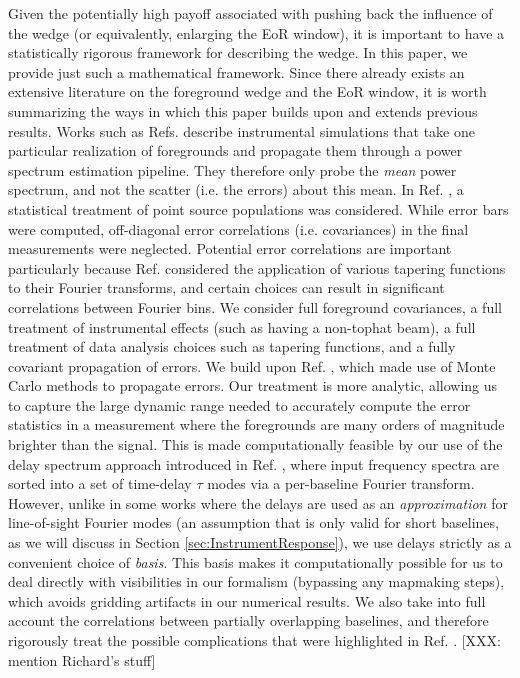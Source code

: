 \documentclass[twocolumn,aps,prd,nofootinbib,showpacs]{revtex4-1}
\begin{document}
Given the potentially high payoff associated with pushing back the influence of the wedge (or equivalently, enlarging the EoR window), it is important to have a statistically rigorous framework for describing the wedge.  In this paper, we provide just such a mathematical framework.  Since there already exists an extensive literature on the foreground wedge and the EoR window, it is worth summarizing the ways in which this paper builds upon and extends previous results.  Works such as Refs. \cite{Datta2010,Vedantham2012,Morales2012} describe instrumental simulations that take one particular realization of foregrounds and propagate them through a power spectrum estimation pipeline.  They therefore only probe the \emph{mean} power spectrum, and not the scatter (i.e. the errors) about this mean.  In Ref. \cite{Thyagarajan2013}, a statistical treatment of point source populations was considered.  While error bars were computed, off-diagonal error correlations (i.e. covariances) in the final measurements were neglected.  Potential error correlations are important particularly because Ref. \cite{Thyagarajan2013} considered the application of various tapering functions to their Fourier transforms, and certain choices can result in significant correlations between Fourier bins.  We consider full foreground covariances, a full treatment of instrumental effects (such as having a non-tophat beam), a full treatment of data analysis choices such as tapering functions, and a fully covariant propagation of errors.  We build upon Ref. \cite{Trott2012}, which made use of Monte Carlo methods to propagate errors.  Our treatment is more analytic, allowing us to capture the large dynamic range needed to accurately compute the error statistics in a measurement where the foregrounds are many orders of magnitude brighter than the signal.  This is made computationally feasible by our use of the delay spectrum approach introduced in Ref. \cite{Parsons2012b}, where input frequency spectra are sorted into a set of time-delay $\tau$ modes via a per-baseline Fourier transform.  However, unlike in some works where the delays are used as an \emph{approximation} for line-of-sight Fourier modes (an assumption that is only valid for short baselines, as we will discuss in Section \ref{sec:InstrumentResponse}), we use delays strictly as a convenient choice of \emph{basis}.  This basis makes it computationally possible for us to deal directly with visibilities in our formalism (bypassing any mapmaking steps), which avoids gridding artifacts in our numerical results.  We also take into full account the correlations between partially overlapping baselines, and therefore rigorously treat the possible complications that were highlighted in Ref. \cite{Hazelton2013}.  [XXX: mention Richard's stuff]
\end{document}
